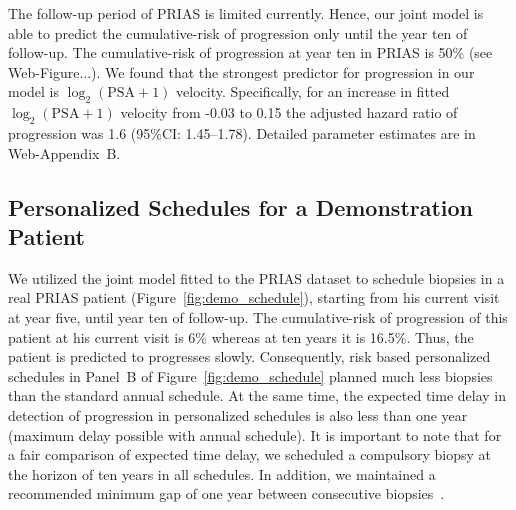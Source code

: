 The follow-up period of PRIAS is limited currently. Hence, our joint model is able to predict the cumulative-risk of progression only until the year ten of follow-up. The cumulative-risk of progression at year ten in PRIAS is 50\% (see Web-Figure...). We found that the strongest predictor for progression in our model is $\log_2(\mbox{PSA} + 1)$ velocity. Specifically, for an increase in fitted $\log_2(\mbox{PSA} + 1)$ velocity from -0.03 to 0.15 the adjusted hazard ratio of progression was 1.6 (95\%CI: 1.45--1.78). Detailed parameter estimates are in Web-Appendix~B.

\subsection{Personalized Schedules for a Demonstration Patient}
We utilized the joint model fitted to the PRIAS dataset to schedule biopsies in a real PRIAS patient (Figure~\ref{fig:demo_schedule}), starting from his current visit at year five, until year ten of follow-up. The cumulative-risk of progression of this patient at his current visit is 6\% whereas at ten years it is 16.5\%. Thus, the patient is predicted to progresses slowly. Consequently, risk based personalized schedules in Panel~B of Figure~\ref{fig:demo_schedule} planned much less biopsies than the standard annual schedule. At the same time, the expected time delay in detection of progression in personalized schedules is also less than one year (maximum delay possible with annual schedule). It is important to note that for a fair comparison of expected time delay, we scheduled a compulsory biopsy at the horizon of ten years in all schedules. In addition, we maintained a recommended minimum gap of one year between consecutive biopsies~\citep{bokhorst2016decade}.

